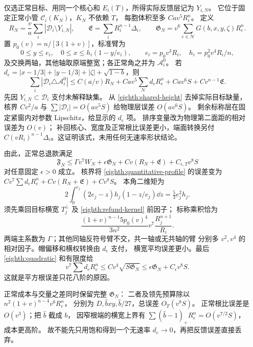 仅选正常目标、用同一个核心和 \(E_i(T)\)，所得实际反馈层记为 \(Y_{i,N}\)。
它位于固定正常小管 \(\mathcal C_i(K_N)\)，\(K_N\) 不依赖 \(T\)，
每胞体积至多 \(Ca v^5R_i^n\)。
定义
\[
 R_N=\frac va\sum_i|\mathscr D_i\setminus Y_{i,N}|,\qquad
 \mathfrak E=\sum_iR_i^{n-1}\Delta_i,\qquad
 \mathfrak G_N=v^6\sum_{e\in\mathcal N}G(b,x,y,\zeta)R_e^n .
\]
置 \(p_0(v)=n/[3(1+v)]\)，标准臂为
\[
 0\le y\le e_i,\quad0\le x\le h_i(1-y/e_i),\qquad
 e_i=p_0v^3R_i,\quad h_i=p_0^2v^4R_i/n,
\]
及交换两轴，其他轴取原端整宽；各正常角之并为 \(\mathcal A_i^0\)。
若 \(d_e=|x-1/3|+|y-1/3|+|\zeta|+\sqrt{1-b}\)，则
\begin{equation}\label{eighth:quantitative-profile}
 \sum_i|\mathscr D_i\triangle\mathcal A_i^0|
 \le C(a/v)R_N+Ca v^5\sum_{\mathcal N}d_eR_e^n
                   +Ca v^6S+Cv^{n-1}\mathfrak E.
\end{equation}
先因 \(Y_{i,N}\subset\mathscr D_i\) 支付未解释缺集。
从 \eqref{eighth:shared-height} 去掉实际目标缺量，核界 \(Cv^2/a\)
与 \(\sum|\mathscr D_i|=O(av^5S)\) 给物理层误差 \(O(av^6S)\)。
剩余标称层在固定紧窗内对参数 Lipschitz，给显示的 \(d_e\) 项。
排序变量改为物理第二面距的相对误差为 \(O(v)\)；
补回核心、宽度及正常根比误差更小，端面转换另付
\(C(vR_i)^{n-1}\Delta_i\)。这证明该式，未用任何无速率形状结论。

由此，正常总退款满足
\begin{equation}\label{eighth:quantitative-refund}
 \mathfrak F_N\le
 \Gamma v^7W_N+\epsilon\mathfrak G_N+
 Cv(R_N+\mathfrak E)+C_{\epsilon,T}v^8S
\end{equation}
对任意固定 \(\epsilon>0\) 成立。
核界将 \eqref{eighth:quantitative-profile} 的误差变为
\(Cv^7\sum d_eR_e^n+Cv(R_N+\mathfrak E)+Cv^8S\)。
本角二维矩为
\[
 2\int_0^{e_j}(2e_j-z)h_j(1-z/e_j)\dd z=\tfrac53e_j^2h_j.
\]
须先乘回目标横宽 \(T_j^\perp\) 及 \eqref{eighth:refund-kernel} 前因子；
标称乘积恰为
\[
 \frac{(1+v)^{n-1}5p_0(v)^4}{3n^2}
             v^7\frac{R_j^{n+1}}{R_i}.
\]
两端主系数为 \(\Gamma\)；其他同轴反符号臂不交，共一轴或无共轴的臂
分别多 \(v^2,v^4\) 的相对因子。帽偏移和横权转换由 \(d_e\) 支付，
横宽平均误差更小。最后 \eqref{eighth:quadratic} 和有限度给
\[
 v^7\sum d_eR_e^n\le Cv^4\sqrt{S\mathfrak G_N}
 \le\epsilon\mathfrak G_N+C_\epsilon v^8S.
\]
这就是平方根误差只花八阶的原因。

正常成本与交量之差同时保留完整 \(\mathfrak G_N\)：
二者及领先预算除以 \(n^2(1+v)^{n-4}v^6R_e^n\)，
分别为 \(D,\widehat bxy,\widehat b/27\)，总误差 \(O_T(v^8S)\)。
正常根比误差是 \(O(v^3)\)；把 \(\widehat b\) 截成 \(b\)，
因窄根端的横宽上界有
\(\sum(\widehat b-1)_+R_e^n=O(v^{7/2}S)\)，成本更高阶。
故不能先只用饱和得到一个无速率 \(d_e\to0\)，再把反馈误差直接丢弃。

